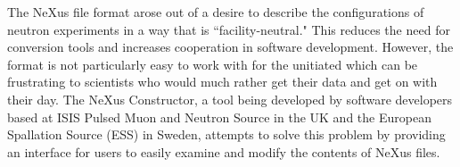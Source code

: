 The NeXus file format arose out of a desire to describe the configurations of neutron experiments in a way that is ``facility-neutral." This reduces the need for conversion tools and increases cooperation in software development. However, the format is not particularly easy to work with for the unitiated which can be frustrating to scientists who would much rather get their data and get on with their day. The NeXus Constructor, a tool being developed by software developers based at ISIS Pulsed Muon and Neutron Source in the UK and the European Spallation Source (ESS) in Sweden, attempts to solve this problem by providing an interface for users to easily examine and modify the contents of NeXus files.
